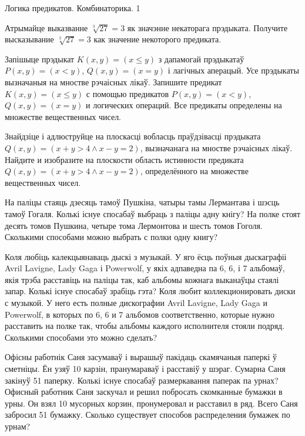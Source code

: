 \documentclass[12pt, a4paper]{article}
\begin{document}
{Логика предикатов. Комбинаторика.}
{1}

\begin{problemList}

\problemItemSimple
{Атрымайце выказванне $\sqrt[3]{27} = 3$ як значэнне некаторага прэдыката.}
{Получите высказывание $\sqrt[3]{27} = 3$ как значение некоторого предиката.}

\bigskip

\problemItemSimple
{Запішыце прэдыкат $K(x, y) = (x \le y)$ з дапамогай прэдыкатаў $P(x, y) = (x < y)$, $Q(x, y) = (x = y)$ і лагічных аперацый.
Усе прэдыкаты вызначаныя на мностве рэчаісных лікаў.}
{Запишите предикат $K(x, y) = (x \le y)$ с помощью предикатов $P(x, y) = (x < y)$, $Q(x, y) = (x = y)$ и логических операций.
Все предикаты определены на множестве вещественных чисел.}

\bigskip

\problemItemSimple
{Знайдзіце і адлюструйце на плоскасці вобласць праўдзівасці прэдыката $Q(x, y) = (x + y > 4 \wedge x - y = 2)$, вызначанага на мностве рэчаісных лікаў.}
{Найдите и изобразите на плоскости область истинности предиката $Q(x, y) = (x + y > 4 \wedge x - y = 2)$, определённого на множестве вещественных чисел.}

\bigskip

\problemItemSimple
{На паліцы стаяць дзесяць тамоў Пушкіна, чатыры тамы Лермантава і шэсць тамоў Гогаля.
Колькі існуе спосабаў выбраць з паліцы адну кнігу?}
{На полке стоят десять томов Пушкина, четыре тома Лермонтова и шесть томов Гоголя.
Сколькими способами можно выбрать с полки одну книгу?}

\bigskip

\problemItemSimple
{Коля любіць калекцыянаваць дыскі з музыкай.
У яго ёсць поўныя дыскаграфіі Avril Lavigne, Lady Gaga і Powerwolf, у якіх адпаведна па 6, 6, і 7 альбомаў,
якія трэба расставіць на паліцы так, каб альбомы кожнага выканаўцы стаялі запар.
Колькі існуе спосабаў зрабіць гэта?}
{Коля любит коллекционировать диски с музыкой.
У него есть полные дискографии Avril Lavigne, Lady Gaga и Powerwolf, в которых по 6, 6 и 7 альбомов соответственно,
которые нужно расставить на полке так, чтобы альбомы каждого исполнителя стояли подряд.
Сколькими способами это можно сделать?}

\bigskip

\problemItemSimple
{Офісны работнік Саня засумаваў і вырашыў пакідаць скамячаныя паперкі ў сметніцы.
Ён узяў 10 карзін, пранумараваў і расставіў у шэраг.
Сумарна Саня закінуў 51 паперку. Колькі існуе спосабаў размеркавання паперак па урнах?}
{Офисный работник Саня заскучал и решил побросать скомканные бумажки в урны.
Он взял 10 мусорных корзин, пронумеровал и расставил в ряд.
Всего Саня забросил 51 бумажку. Сколько существует способов распределения бумажек по урнам?}


\end{problemList}
\end{document}
